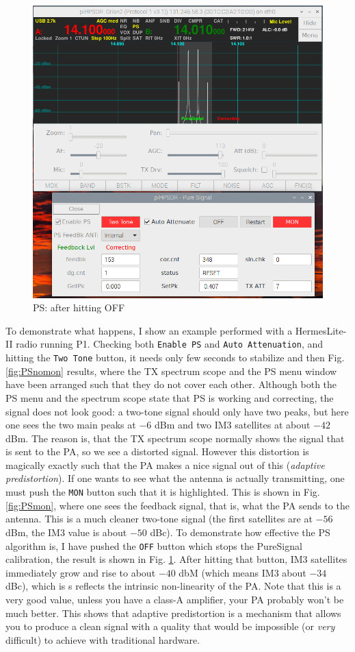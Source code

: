 \documentclass[12pt]{book}
\def\rett#1{\texttt{\color{red}#1}}
\begin{document}
\begin{figure}[t!]
\center
\includegraphics[width=12cm]{PSoff.png}
\caption{PS: after hitting OFF}
\label{fig:PSoff}
\end{figure}

To demonstrate what happens, I show an example performed with a HermesLite-II
radio running P1. Checking both \rett{Enable PS} and
\rett{Auto Attenuation}, and hitting the \rett{Two Tone} button, it needs only few
seconds to stabilize and then Fig. \ref{fig:PSnomon} results, where the TX
spectrum scope and the PS menu window have been arranged such that they do
not cover each other. Although both the PS menu and the spectrum scope state
that PS is working and correcting, the signal does not look good: a two-tone
signal should only have two peaks, but here one sees the two main peaks at $-6$ dBm
and two IM3 satellites at about $-42$ dBm.
The reason is, that the TX spectrum scope
normally shows the signal that is sent to the PA, so we see a distorted signal.
However this distortion is magically exactly such that the PA makes a nice signal
out of this (\textit{adaptive predistortion}). If one wants to see what the antenna
 is actually transmitting, one must
push the \rett{MON} button such that it is highlighted. 
This is shown in Fig. \ref{fig:PSmon}, where one sees the
feedback signal, that is, what the PA sends to the antenna.
This is a much cleaner two-tone signal (the first satellites are at $-56$ dBm,
the IM3 value is about $-50$ dBc). To demonstrate how effective the PS algorithm is,
I have pushed the \rett{OFF} button which stops the PureSignal calibration, the result
is shown in Fig. \ref{fig:PSoff}. After hitting that button, IM3 satellites immediately
grow and rise to about $-40$ dbM (which means IM3
about $-34$ dBc), which is s reflects the intrinsic
non-linearity of the PA.
 Note that this is a very good value,
unless you have a class-A amplifier, your PA probably won't be much better.
This shows that adaptive predistortion is a mechanism that allows you to produce a clean
signal with a quality that would be impossible (or \textit{very} difficult) to achieve
with traditional hardware.
\end{document}

